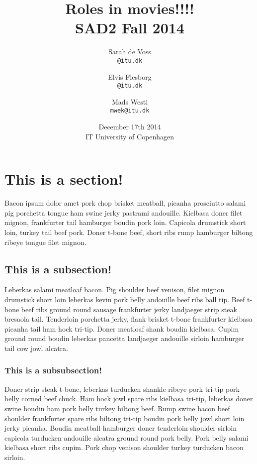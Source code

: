 \documentclass[a4paper,11pt]{article}
\begin{document}
\date{December 17th 2014\\ IT University of Copenhagen}
\title{Roles in movies!!!!\\SAD2 Fall 2014}

\author{Sarah de Voss\\
\texttt{@itu.dk}
\and Elvis Flesborg\\
\texttt{@itu.dk}
\and Mads Westi\\
\texttt{mwek@itu.dk}}
\clearpage\maketitle
\newpage
\thispagestyle{empty}
\setcounter{page}{1}
\tableofcontents
\newpage
\section{This is a section!}
Bacon ipsum dolor amet pork chop brisket meatball, picanha prosciutto salami pig porchetta tongue ham swine jerky pastrami andouille. Kielbasa doner filet mignon, frankfurter tail hamburger boudin pork loin. Capicola drumstick short loin, turkey tail beef pork. Doner t-bone beef, short ribs rump hamburger biltong ribeye tongue filet mignon.\\

\subsection{This is a subsection!}
Leberkas salami meatloaf bacon. Pig shoulder beef venison, filet mignon drumstick short loin leberkas kevin pork belly andouille beef ribs ball tip. Beef t-bone beef ribs ground round sausage frankfurter jerky landjaeger strip steak bresaola tail. Tenderloin porchetta jerky, flank brisket t-bone frankfurter kielbasa picanha tail ham hock tri-tip. Doner meatloaf shank boudin kielbasa. Cupim ground round boudin leberkas pancetta landjaeger andouille sirloin hamburger tail cow jowl alcatra.\\

\subsubsection{This is a subsubsection!}
Doner strip steak t-bone, leberkas turducken shankle ribeye pork tri-tip pork belly corned beef chuck. Ham hock jowl spare ribs kielbasa tri-tip, leberkas doner swine boudin ham pork belly turkey biltong beef. Rump swine bacon beef shoulder frankfurter spare ribs biltong tri-tip boudin pork belly jowl short loin jerky picanha. Boudin meatball hamburger doner tenderloin shoulder sirloin capicola turducken andouille alcatra ground round pork belly. Pork belly salami kielbasa short ribs cupim. Pork chop venison shoulder turkey turducken bacon sirloin.\\
\end{document}
